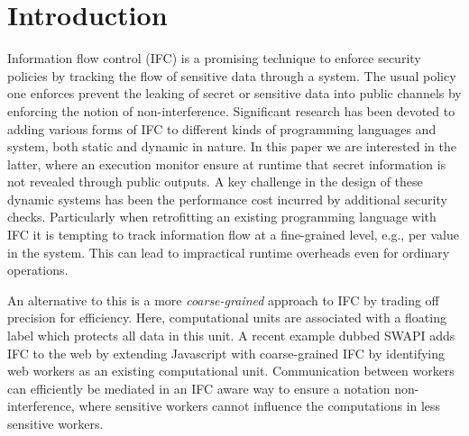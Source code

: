 \section{Introduction}
\label{sec:intro}



Information flow control (IFC) is a promising technique to enforce
security policies by tracking the flow of sensitive data through
a system.  The usual policy one enforces prevent the leaking of secret or sensitive
data into public channels by enforcing the notion of non-interference.
Significant research has been devoted to adding various
forms of IFC to different kinds of programming languages and system,
both static and dynamic in nature.  In this paper we are interested
in the latter, where an execution monitor ensure at runtime that secret
information is not revealed through public outputs.
A key challenge in the design of these dynamic systems has been the
performance cost incurred by additional security checks.
Particularly when retrofitting an existing programming language with
IFC it is tempting to track information flow at a fine-grained level,
e.g., per value in the system.  This can lead to impractical
runtime overheads even for ordinary operations.

An alternative to this is a more \textit{coarse-grained} approach
to IFC by trading off precision for efficiency.  Here, computational
units are associated with a floating label which protects all data
in this unit.
A recent example dubbed SWAPI adds IFC to the web by extending
Javascript with coarse-grained IFC by identifying web workers as
an existing computational unit.  Communication between workers can
efficiently be mediated in an IFC aware way to ensure a notation
non-interference, where sensitive workers cannot influence the
computations in less sensitive workers.

